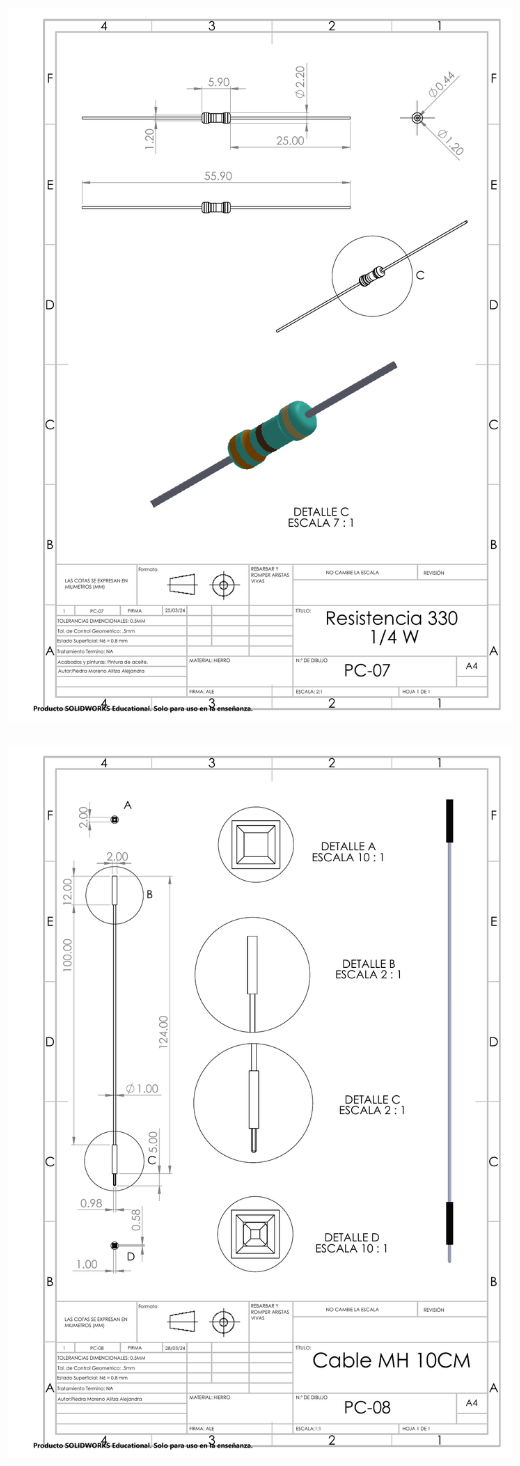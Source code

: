 \begin{center}
\includegraphics[width=.9\textwidth]{22/img/resistenciaDibujo.PDF}~\\[15cm]

\includegraphics[width=.9\textwidth]{22/img/cableMHDibujo.PDF}~\\[15cm]


\end{center}
